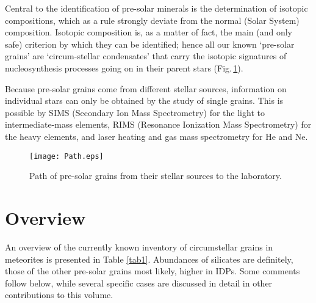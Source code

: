\documentclass{iau}
\begin{document}
Central to the identification of pre-solar minerals is the determination of isotopic
compositions, which as a rule strongly deviate from the normal (Solar System) composition.
Isotopic composition is, as a matter of fact, the main (and only safe) criterion by which they
can be identified; hence all our known `pre-solar grains' are `circum-stellar condensates' that
carry the isotopic signatures of nucleosynthesis processes going on in their parent stars
(Fig.\,\ref{fig1}).

Because pre-solar grains come from different stellar sources, information on individual
stars can only be obtained by the study of single grains. This is possible by SIMS (Secondary
Ion Mass Spectrometry) for the light to intermediate-mass elements, RIMS (Resonance
Ionization Mass Spectrometry) for the heavy elements, and laser heating and gas mass
spectrometry for He and Ne.

\begin{figure}[b]
\begin{center}
 \texttt{[image: Path.eps]} 
 \caption{Path of pre-solar grains from their stellar sources to the laboratory.}
   \label{fig1}
\end{center}
\end{figure}

\section{Overview}

An overview of the currently known inventory of circumstellar grains in meteorites is
presented in Table \ref{tab1}. Abundances of silicates are definitely, those of the other pre-solar
grains most likely, higher in IDPs. Some comments follow below, while several specific cases
are discussed in detail in other contributions to this volume.
\end{document}
